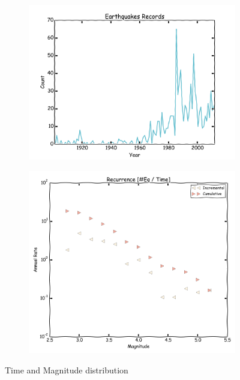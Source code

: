 \documentclass[final]{beamer}
\begin{document}
\begin{poster}
\begin{figure}[H]
	\centering
	\begin{subfigure}[T]{0.52\textwidth}
	  	\centering
		\includegraphics[width=1.0\textwidth]{hmtk_bsb2013_rate}
		\label{fig:sa_eq_record}
	\end{subfigure}
	\begin{subfigure}[T]{0.45\textwidth}
	  	\centering
		\includegraphics[width=1.0\textwidth]{occurrence}
		\label{fig:br_eq_record}
    \end{subfigure}
	\caption{Time and Magnitude distribution}
	\label{fig:eq_record}
\end{figure}




\end{poster}
\end{document}
